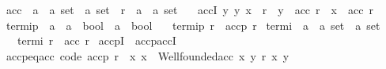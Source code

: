 \begin{isabellebody}
\begin{isamarkuptext}
\end{isamarkuptext}\isamarkuptrue%
\isamarkupfalse%
\ acc\ {\isacharcolon}{\kern0pt}{\isacharcolon}{\kern0pt}\ {\isachardoublequoteopen}{\isacharparenleft}{\kern0pt}{\isacharprime}{\kern0pt}a\ {\isasymtimes}\ {\isacharprime}{\kern0pt}a{\isacharparenright}{\kern0pt}\ set\ {\isasymRightarrow}\ {\isacharprime}{\kern0pt}a\ set{\isachardoublequoteclose}\ \ r\ {\isacharcolon}{\kern0pt}{\isacharcolon}{\kern0pt}\ {\isachardoublequoteopen}{\isacharparenleft}{\kern0pt}{\isacharprime}{\kern0pt}a\ {\isasymtimes}\ {\isacharprime}{\kern0pt}a{\isacharparenright}{\kern0pt}\ set{\isachardoublequoteclose}\isanewline
\ \ \ accI{\isacharcolon}{\kern0pt}\ {\isachardoublequoteopen}{\isacharparenleft}{\kern0pt}{\isasymAnd}y{\isachardot}{\kern0pt}\ {\isacharparenleft}{\kern0pt}y{\isacharcomma}{\kern0pt}\ x{\isacharparenright}{\kern0pt}\ {\isasymin}\ r\ {\isasymLongrightarrow}\ y\ {\isasymin}\ acc\ r{\isacharparenright}{\kern0pt}\ {\isasymLongrightarrow}\ x\ {\isasymin}\ acc\ r{\isachardoublequoteclose}\isanewline
\isanewline
{}\isamarkupfalse%
\ termip\ {\isacharcolon}{\kern0pt}{\isacharcolon}{\kern0pt}\ {\isachardoublequoteopen}{\isacharparenleft}{\kern0pt}{\isacharprime}{\kern0pt}a\ {\isasymRightarrow}\ {\isacharprime}{\kern0pt}a\ {\isasymRightarrow}\ bool{\isacharparenright}{\kern0pt}\ {\isasymRightarrow}\ {\isacharprime}{\kern0pt}a\ {\isasymRightarrow}\ bool{\isachardoublequoteclose}\isanewline
\ \ \ {\isachardoublequoteopen}termip\ r\ {\isasymequiv}\ accp\ {\isacharparenleft}{\kern0pt}r{\isasyminverse}{\isasyminverse}{\isacharparenright}{\kern0pt}{\isachardoublequoteclose}\isanewline
\isanewline
{}\isamarkupfalse%
\ termi\ {\isacharcolon}{\kern0pt}{\isacharcolon}{\kern0pt}\ {\isachardoublequoteopen}{\isacharparenleft}{\kern0pt}{\isacharprime}{\kern0pt}a\ {\isasymtimes}\ {\isacharprime}{\kern0pt}a{\isacharparenright}{\kern0pt}\ set\ {\isasymRightarrow}\ {\isacharprime}{\kern0pt}a\ set{\isachardoublequoteclose}\isanewline
\ \ \ {\isachardoublequoteopen}termi\ r\ {\isasymequiv}\ acc\ {\isacharparenleft}{\kern0pt}r{\isasyminverse}{\isacharparenright}{\kern0pt}{\isachardoublequoteclose}\isanewline
\isanewline
{}\isamarkupfalse%
\ accpI\ {\isacharequal}{\kern0pt}\ accp{\isachardot}{\kern0pt}accI\isanewline
\isanewline
{}\isamarkupfalse%
\ accp{\isacharunderscore}{\kern0pt}eq{\isacharunderscore}{\kern0pt}acc\ {\isacharbrackleft}{\kern0pt}code{\isacharbrackright}{\kern0pt}{\isacharcolon}{\kern0pt}\ {\isachardoublequoteopen}accp\ r\ {\isacharequal}{\kern0pt}\ {\isacharparenleft}{\kern0pt}{\isasymlambda}x{\isachardot}{\kern0pt}\ x\ {\isasymin}\ Wellfounded{\isachardot}{\kern0pt}acc\ {\isacharbraceleft}{\kern0pt}{\isacharparenleft}{\kern0pt}x{\isacharcomma}{\kern0pt}\ y{\isacharparenright}{\kern0pt}{\isachardot}{\kern0pt}\ r\ x\ y{\isacharbraceright}{\kern0pt}{\isacharparenright}{\kern0pt}{\isachardoublequoteclose}\isanewline

\end{isabellebody}
